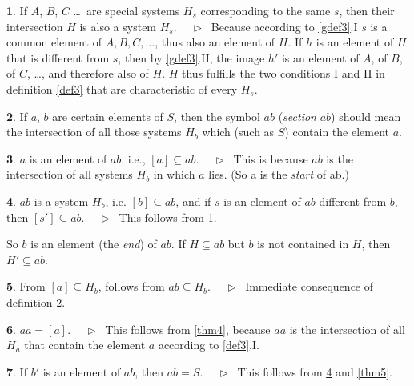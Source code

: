 \documentclass[leqno,hidelinks]{article}
\theoremstyle{definition}
\newtheorem{satz}{\protect\satzname}
\newtheorem{deff}[satz]{\protect\deffname}
\newcommand{\satzname}{}
\newcommand{\deffname}{}
\renewcommand{\satzname}{\hspace{-4pt}.\ Satz}%
\renewcommand{\deffname}{\hspace{-4pt}.\ Definition}%
\renewcommand{\satzname}{\hspace{-4pt}.\ Theorem}%
\renewcommand{\deffname}{\hspace{-4pt}.\ Definition}%
\newcommand\Beweis{\medskip \newline $ \phantom{'.'} \rhd \ $}%
\newcommand{\partof}{\subseteq}
\newcommand{\sref}[1]{\underline{\ref{#1}}}%
\begin{document}
\begin{paracol}{2}
\begin{satz}\label{thm8}
If $A$, $B$, $C$ \ldots\ are special systems $H_s$ corresponding to the same $s$,
then their intersection $H$ is also a system $H_s$.
\Beweis
Because according to \sref{gdef3}{\color{ultrav}.I} $s$ is a common element of
$A, B, C, \ldots$, thus also an element of $H$. If $h$ is an element of $H$ that
is different from $s$, then by \sref{gdef3}{\color{ultrav}.II}, the image $h'$
is an element of $A$, of $B$, of $C$, \ldots, and therefore also of $H$. $H$ thus
fulfills the two conditions I and II in definition \sref{def3} that are
characteristic of every $H_s$.
\end{satz}

\begin{deff}\label{def9}
If $a$, $b$ are certain elements of $S$, then the symbol $ab$ (\emph{section} $ab$)
should mean the intersection of all those systems $H_b$ which (such as $S$)
contain the element $a$.%
\end{deff}

\newpage
\begin{satz}\label{thm10}
$a$ is an element of $ab$, i.e., $[a] \partof ab$.
\Beweis
This is because $ab$ is the intersection of all systems $H_b$ in which $a$ lies.
(So a is the \emph{start} of ab.)
\end{satz}

\begin{satz}\label{thm11}
$ab$ is a system $H_b$, i.e. $[b] \partof ab$, and if $s$ is an element of $ab$
different from $b$, then $[s'] \partof ab$.
\Beweis
This follows from \sref{thm8}.
\end{satz}

So $b$ is an element (the \emph{end}) of $ab$. If $H \partof ab$ but $b$ is not
contained in $H$, then $H' \partof ab$.

\begin{satz}\label{thm12}
From $[a] \partof H_b$, follows from $ab \partof H_b$.
\Beweis
Immediate consequence of definition \sref{def9}.
\end{satz}

\begin{satz}\label{thm13}
$aa = [a]$.
\Beweis
This follows from \sref{thm4}, because $aa$ is the intersection of all $H_a$
that contain the element $a$ according to \sref{def3}.I.
\end{satz}

\begin{satz}\label{thm14}
If $b'$ is an element of $ab$, then $ab = S$.
\Beweis
This follows from \sref{thm11} and \sref{thm5}.
\end{satz}


\end{paracol}
\end{document}
